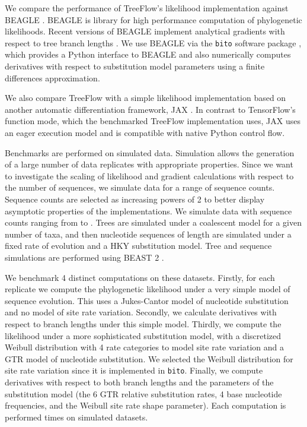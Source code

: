 We compare the performance of TreeFlow's likelihood implementation against BEAGLE \cite{ayres2019beagle}. BEAGLE is library for high performance computation of phylogenetic likelihoods. Recent versions of BEAGLE implement analytical gradients with respect to tree branch lengths \cite{ji2020gradients}. We use BEAGLE via the \texttt{bito} software package \cite{bito}, which provides a Python interface to BEAGLE and also numerically computes derivatives with respect to substitution model parameters using a finite differences approximation.

We also compare TreeFlow with a simple likelihood implementation \cite{phylojax} based on another automatic differentiation framework, JAX \cite{jax2018github}. In contrast to TensorFlow's function mode, which the benchmarked TreeFlow implementation uses, JAX uses an eager execution model and is compatible with native Python control flow.

Benchmarks are performed on simulated data. Simulation allows the generation of a large number of data replicates with appropriate properties. Since we want to investigate the scaling of likelihood and gradient calculations with respect to the number of sequences, we simulate data for a range of sequence counts. Sequence counts are selected as increasing powers of 2 to better display asymptotic properties of the implementations. We simulate data with sequence counts ranging from  to . Trees are simulated under a coalescent model for a given number of taxa, and then nucleotide sequences of length  are simulated under a fixed rate of evolution and a HKY substitution model. Tree and sequence simulations are performed using BEAST 2 \cite{bouckaert2019beast}.

We benchmark 4 distinct computations on these datasets. Firstly, for each replicate we compute the phylogenetic likelihood under a very simple model of sequence evolution. This uses a Jukes-Cantor model of nucleotide substitution and no model of site rate variation. Secondly, we calculate derivatives with respect to branch lengths under this simple model. Thirdly, we compute the likelihood under a more sophisticated substitution model, with a discretized Weibull distribution with 4 rate categories to model site rate variation and a GTR model of nucleotide substitution. We selected the Weibull distribution for site rate variation since it is implemented in \texttt{bito}. Finally, we compute derivatives with respect to both branch lengths and the parameters of the substitution model (the 6 GTR relative substitution rates, 4 base nucleotide frequencies, and the Weibull site rate shape parameter). Each computation is performed  times on  simulated datasets.


